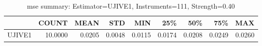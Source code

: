 \begin{table}[ht]
\centering
\caption{mse summary: Estimator=UJIVE1, Instruments=111, Strength=0.40}
\begin{tabular}{lrrrrrrrr}
\toprule
 & COUNT & MEAN & STD & MIN & 25\% & 50\% & 75\% & MAX \\
\midrule
UJIVE1 & 10.0000 & 0.0205 & 0.0048 & 0.0115 & 0.0174 & 0.0208 & 0.0249 & 0.0260 \\
\bottomrule
\end{tabular}
\end{table}
